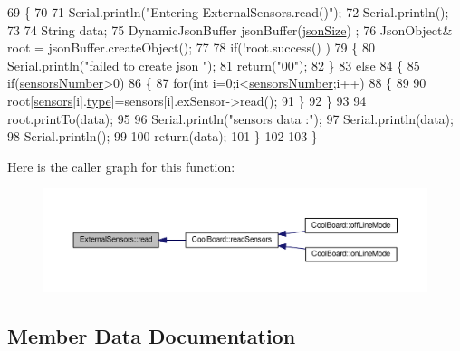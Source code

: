 \begin{DoxyCode}
69 \{
70 
71     Serial.println(\textcolor{stringliteral}{"Entering ExternalSensors.read()"});
72     Serial.println();
73 
74     String data;
75     DynamicJsonBuffer  jsonBuffer(\hyperlink{classExternalSensors_acacea86d74d967b57fcff282d26cff57}{jsonSize}) ;
76     JsonObject& root = jsonBuffer.createObject();
77 
78     \textcolor{keywordflow}{if}(!root.success() )
79     \{
80         Serial.println(\textcolor{stringliteral}{"failed to create json "});
81         \textcolor{keywordflow}{return}(\textcolor{stringliteral}{"00"});
82     \}
83     \textcolor{keywordflow}{else}
84     \{
85         \textcolor{keywordflow}{if}(\hyperlink{classExternalSensors_a58e4fbf9adeae787d92be5fa33043b5d}{sensorsNumber}>0)
86         \{
87             \textcolor{keywordflow}{for}(\textcolor{keywordtype}{int} i=0;i<\hyperlink{classExternalSensors_a58e4fbf9adeae787d92be5fa33043b5d}{sensorsNumber};i++)
88             \{
89             
90                 root[\hyperlink{classExternalSensors_a284233f884fcf00154a44740cf1d9e1e}{sensors}[i].\hyperlink{structExternalSensors_1_1sensor_a6acfdb02c742c2110d7bd2b5d9fce9e7}{type}]=sensors[i].exSensor->read();       
91             \}
92         \}   
93         
94         root.printTo(data);
95 
96         Serial.println(\textcolor{stringliteral}{"sensors data :"});
97         Serial.println(data);
98         Serial.println();
99     
100         \textcolor{keywordflow}{return}(data);
101     \}
102 
103 \}
\end{DoxyCode}
Here is the caller graph for this function\+:\nopagebreak
\begin{figure}[H]
\begin{center}
\leavevmode
\includegraphics[width=350pt]{classExternalSensors_a53177b81eca3be89508b5511ddcd00fc_icgraph}
\end{center}
\end{figure}


\subsection{Member Data Documentation}
\mbox{\label{classExternalSensors_acacea86d74d967b57fcff282d26cff57}} 

